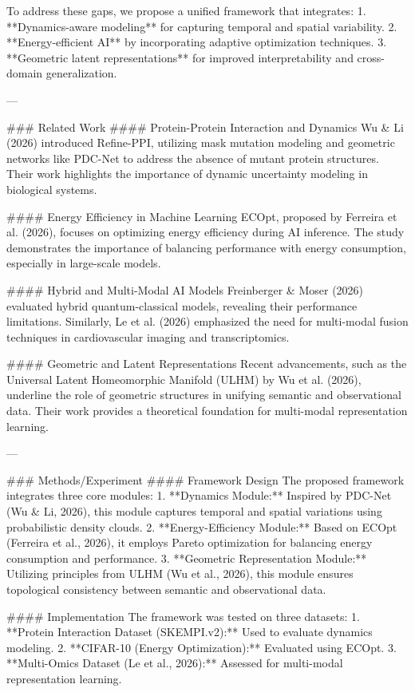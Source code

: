 To address these gaps, we propose a unified framework that integrates:  
1. **Dynamics-aware modeling** for capturing temporal and spatial variability.  
2. **Energy-efficient AI** by incorporating adaptive optimization techniques.  
3. **Geometric latent representations** for improved interpretability and cross-domain generalization.  

---

### Related Work  
#### Protein-Protein Interaction and Dynamics  
Wu & Li (2026) introduced Refine-PPI, utilizing mask mutation modeling and geometric networks like PDC-Net to address the absence of mutant protein structures. Their work highlights the importance of dynamic uncertainty modeling in biological systems.

#### Energy Efficiency in Machine Learning  
ECOpt, proposed by Ferreira et al. (2026), focuses on optimizing energy efficiency during AI inference. The study demonstrates the importance of balancing performance with energy consumption, especially in large-scale models.

#### Hybrid and Multi-Modal AI Models  
Freinberger & Moser (2026) evaluated hybrid quantum-classical models, revealing their performance limitations. Similarly, Le et al. (2026) emphasized the need for multi-modal fusion techniques in cardiovascular imaging and transcriptomics.

#### Geometric and Latent Representations  
Recent advancements, such as the Universal Latent Homeomorphic Manifold (ULHM) by Wu et al. (2026), underline the role of geometric structures in unifying semantic and observational data. Their work provides a theoretical foundation for multi-modal representation learning.

---

### Methods/Experiment  
#### Framework Design  
The proposed framework integrates three core modules:  
1. **Dynamics Module:** Inspired by PDC-Net (Wu & Li, 2026), this module captures temporal and spatial variations using probabilistic density clouds.  
2. **Energy-Efficiency Module:** Based on ECOpt (Ferreira et al., 2026), it employs Pareto optimization for balancing energy consumption and performance.  
3. **Geometric Representation Module:** Utilizing principles from ULHM (Wu et al., 2026), this module ensures topological consistency between semantic and observational data.

#### Implementation  
The framework was tested on three datasets:  
1. **Protein Interaction Dataset (SKEMPI.v2):** Used to evaluate dynamics modeling.  
2. **CIFAR-10 (Energy Optimization):** Evaluated using ECOpt.  
3. **Multi-Omics Dataset (Le et al., 2026):** Assessed for multi-modal representation learning.

